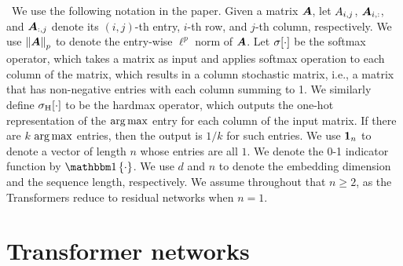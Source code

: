 ~We use the following notation in the paper. Given a matrix ${\bm{A}}$, let ${A}_{i,j}$, ${\bm{A}}_{i,:}$, and ${\bm{A}}_{:, j}$ denote its $(i,j)$-th entry, $i$-th row, and $j$-th column, respectively. We use $\left\|{{\bm{A}}}\right\|_p$ to denote the entry-wise $\ell^p$ norm of ${\bm{A}}$. Let $\sigma[\cdot]$ be the softmax operator, which takes a matrix as input and applies softmax operation to each column of the matrix, which results in a column stochastic matrix, i.e., a matrix that has non-negative entries with each column summing to 1. We similarly define $\sigma_{\rm H}[\cdot]$ to be the hardmax operator, which outputs the one-hot representation of the $\operatorname*{arg\,max}$ entry for each column of the input matrix. If there are $k$ $\operatorname*{arg\,max}$ entries, then the output is $1/k$ for such entries.
We use ${\bm{1}}_n$ to denote a vector of length $n$ whose entries are all $1$. We denote the 0-1 indicator function by $\indic{\cdot}$. We use $d$ and $n$ to denote the embedding dimension and the sequence length, respectively. We assume throughout that $n \geq 2$, as the Transformers reduce to residual networks when $n=1$.

\vspace*{-5pt}
\section{Transformer networks}\label{sec:transformerblocks}
\vspace*{-5pt}



